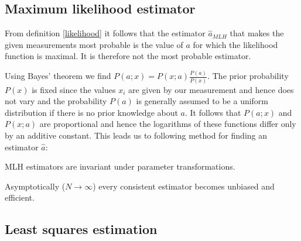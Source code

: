 {\subsection{Maximum likelihood estimator}
	
	From definition \ref{likelihood} it follows that the estimator $\hat{a}_{MLH}$ that makes the given measurements most probable is the value of $a$ for which the likelihood function is maximal. It is therefore not the most probable estimator.
	
	Using Bayes' theorem we find $P(a;x) = P(x;a)\frac{P(a)}{P(x)}$. The prior probability $P(x)$ is fixed since the values $x_i$ are given by our measurement and hence does not vary and the probability $P(a)$ is generally assumed to be a uniform distribution if there is no prior knowledge about $a$. It follows that $P(a;x)$ and $P(x;a)$ are proportional and hence the logarithms of these functions differ only by an additive constant. This leads us to following method for finding an estimator $\hat{a}$:

	\begin{property}
		MLH estimators are invariant under parameter transformations.
	\end{property}
    
	\begin{property}
		Asymptotically ($N\rightarrow\infty$) every consistent estimator becomes unbiased and efficient.
	\end{property}

\subsection{Least squares estimation}
	
}
